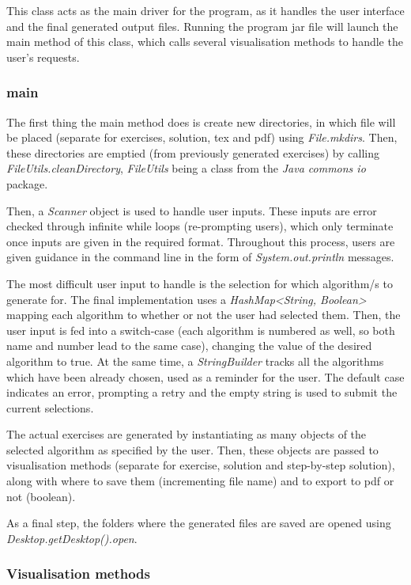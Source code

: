 \documentclass{l4proj}
\begin{document}
This class acts as the main driver for the program, as it handles the user interface and the final generated output files. Running the program jar file will launch the main method of this class, which calls several visualisation methods to handle the user's requests. 

\subsubsection{main}

The first thing the main method does is create new directories, in which file will be placed (separate for exercises, solution, tex and pdf) using \emph{File.mkdirs}. Then, these directories are emptied (from previously generated exercises) by calling \emph{FileUtils.cleanDirectory}, \emph{FileUtils} being a class from the \emph{Java commons io} package.

Then, a \emph{Scanner} object is used to handle user inputs. These inputs are error checked through infinite while loops (re-prompting users), which only terminate once inputs are given in the required format. Throughout this process, users are given guidance in the command line in the form of \emph{System.out.println} messages.

The most difficult user input to handle is the selection for which algorithm/s to generate for. The final implementation uses a \emph{HashMap<String, Boolean>} mapping each algorithm to whether or not the user had selected them. Then, the user input is fed into a switch-case (each algorithm is numbered as well, so both name and number lead to the same case), changing the value of the desired algorithm to true. At the same time, a \emph{StringBuilder} tracks all the algorithms which have been already chosen, used as a reminder for the user. The default case indicates an error, prompting a retry and the empty string is used to submit the current selections.

The actual exercises are generated by instantiating as many objects of the selected algorithm as specified by the user. Then, these objects are passed to visualisation methods (separate for exercise, solution and step-by-step solution), along with where to save them (incrementing file name) and to export to pdf or not (boolean).

As a final step, the folders where the generated files are saved are opened using \emph{Desktop.getDesktop().open}.

\subsubsection{Visualisation methods}
\end{document}
